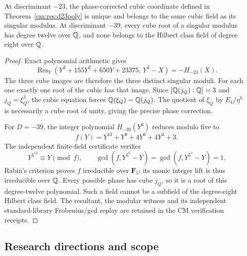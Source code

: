 \begin{proposition}
\label{cmweber:prop:degrees}
At discriminant $-23$, the phase-corrected cubic coordinate defined in
Theorem~\ref{cm:res:d23poly} is unique and belongs to the same cubic field
as its singular modulus. At discriminant $-39$, every cube root of a
singular modulus has degree twelve over $\mathbb{Q}$, and none belongs to the
Hilbert class field of degree eight over $\mathbb{Q}$.
\end{proposition}
\begin{proof}
Exact polynomial arithmetic gives
\[
 \operatorname{Res}_Y(Y^3+155Y^2+650Y+23375,\,Y^3-X)=-H_{-23}(X).
\]
The three cube images are therefore the three distinct singular moduli.
For each one exactly one root of the cubic has that image. Since
$[\mathbb{Q}(j_Q):\mathbb{Q}]=3$ and $j_Q=\xi_Q^3$, the cubic equation forces
$\mathbb{Q}(\xi_Q)=\mathbb{Q}(j_Q)$. The quotient of $\xi_Q$ by $E_4/\eta^8$ is
necessarily a cube root of unity, giving the precise phase correction.

For $D=-39$, the integer polynomial $H_{-39}(Y^3)$ reduces modulo five to
\[
 f(Y)=Y^{12}+Y^9+4Y^6+4Y^3+3.
\]
The independent finite-field certificate verifies
\[
 Y^{5^{12}}\equiv Y\pmod f,\qquad
 \gcd(f,Y^{5^6}-Y)=\gcd(f,Y^{5^4}-Y)=1.
\]
Rabin's criterion proves $f$ irreducible over $\mathbf F_5$; its monic
integer lift is thus irreducible over $\mathbb{Q}$. Every possible phase has
cube $j_Q$, so it is a root of this degree-twelve polynomial. Such a
field cannot be a subfield of the degree-eight Hilbert class field.
The resultant, the modular witness and its independent standard-library
Frobenius/gcd replay are retained in the CM verification receipts.
\end{proof}

\subsection{Research directions and scope}

